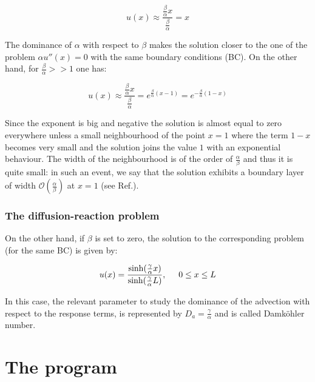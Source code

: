 \documentclass[11pt]{article}
\theoremstyle{theorem}
\theoremstyle{definition}
\begin{document}
\begin{equation}
	\label{key:AD-smallP}
	u(x)\approx\frac{\frac{\beta}{\alpha}x}{\frac{\beta}{\alpha}}=x
\end{equation}

The dominance of $\alpha$ with respect to $\beta$ makes the solution closer to the one of the problem $\alpha u''(x)=0$ with the same boundary conditions (BC). On the other hand, for $\frac{\beta}{\alpha}>>1$ one has:

\begin{equation}
\label{key:AD-bigP}
u(x)\approx\frac{\frac{\beta}{\alpha}x}{\frac{\beta}{\alpha}}=e^{\frac{\beta}{\alpha}(x-1)}=e^{-\frac{\beta}{\alpha}(1-x)}
\end{equation}

Since the exponent is big and negative the solution is almost equal to zero everywhere unless a small neighbourhood of the point $x=1$ where the term $ 1-x $ becomes very small and the solution joins the value $1$ with an exponential behaviour. The width of the neighbourhood is of the order of $\frac{\alpha}{\beta}$ and thus it is quite small: in such an event, we say that the solution exhibits a boundary layer of width $\mathcal{O}\left(\frac{\alpha}{\beta}\right)$ at $x=1$ (see Ref.\cite{numerical-math}).

\subsubsection{The diffusion-reaction problem}
On the other hand, if $\beta$ is set to zero, the solution to the corresponding problem (for the same BC) is given by:

\begin{equation}
	\label{eqn:DR-sol}
	u(x)=\frac{\sinh(\frac{\gamma}{\alpha}x)}{\sinh(\frac{\gamma}{\alpha}L)},\hspace{5mm} 0\le x\le L
\end{equation}

In this case, the relevant parameter to study the dominance of the advection with respect to the response terms, is represented by $D_a=\frac{\gamma}{\alpha}$ and is called Damk\"{o}hler number.\\

\section{The program}
\end{document}
